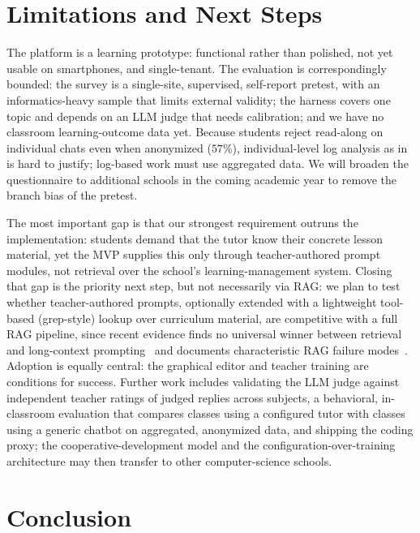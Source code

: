 \documentclass[runningheads]{llncs}
\begin{document}
\section{Limitations and Next Steps}
\label{sec:limitations}

The platform is a learning prototype: functional rather than polished, not yet usable on smartphones, and single-tenant. The evaluation is correspondingly bounded: the survey is a single-site, supervised, self-report pretest, with an informatics-heavy sample that limits external validity; the harness covers one topic and depends on an LLM judge that needs calibration; and we have no classroom learning-outcome data yet. Because students reject read-along on individual chats even when anonymized ($57\%$), individual-level log analysis as in~\cite{gabrovsek2025custom} is hard to justify; log-based work must use aggregated data. We will broaden the questionnaire to additional schools in the coming academic year to remove the branch bias of the pretest.

The most important gap is that our strongest requirement outruns the implementation: students demand that the tutor know their concrete lesson material, yet the MVP supplies this only through teacher-authored prompt modules, not retrieval over the school's learning-management system. Closing that gap is the priority next step, but not necessarily via RAG: we plan to test whether teacher-authored prompts, optionally extended with a lightweight tool-based (grep-style) lookup over curriculum material, are competitive with a full RAG pipeline, since recent evidence finds no universal winner between retrieval and long-context prompting~\cite{li2025lara} and documents characteristic RAG failure modes~\cite{agrawal2024mindfulrag}. Adoption is equally central: the graphical editor and teacher training are conditions for success. Further work includes validating the LLM judge against independent teacher ratings of judged replies across subjects, a behavioral, in-classroom evaluation that compares classes using a configured tutor with classes using a generic chatbot on aggregated, anonymized data, and shipping the coding proxy; the cooperative-development model and the configuration-over-training architecture may then transfer to other computer-science schools.

\section{Conclusion}
\label{sec:conclusion}
\end{document}
